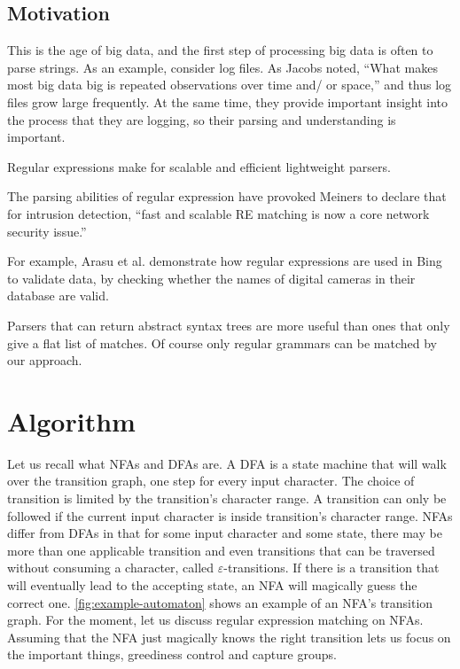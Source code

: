 \documentclass[english,twocolumn]{article}
\theoremstyle{definition}
\newcommand{\seclabel}[1]{\label{sec:#1}}
\begin{document}
\subsection{Motivation}

This is the age of big data, and the first step of processing big
data is often to parse strings. As an example, consider log files.
As Jacobs\cite{Jaco09a}
noted, ``What makes most big data big is repeated observations over
time and/ or space,'' and thus log files grow large frequently. At
the same time, they provide important insight into the process that
they are logging, so their parsing and understanding is important. 

Regular expressions make for scalable and efficient lightweight parsers.\cite{Kart96a} 

The parsing abilities of regular expression have provoked Meiners to declare
that for intrusion detection, ``fast and scalable RE matching is
now a core network security issue.'' \cite{Mein10a}

For example, Arasu et al. \cite{Aras12a} demonstrate how regular
expressions are used in Bing to validate data, by checking whether
the names of digital cameras in their database are valid.

Parsers that can return abstract syntax trees are more useful than
ones that only give a flat list of matches. Of course only regular
grammars can be matched by our approach.

\section{Algorithm}
\seclabel{algo}

Let us recall what NFAs and DFAs are. A DFA is a state machine that
will walk over the transition graph, one step for every input
character. The choice of transition is limited by the transition's
character range. A transition can only be followed if the current
input character is inside transition's character range. NFAs differ
from DFAs in that for some input character and some state, there
may be more than one applicable transition and even transitions that can
be traversed without consuming a character, called $\varepsilon$-transitions.
If there is a transition that will eventually lead to the accepting
state, an NFA will magically guess the correct one. \autoref{fig:example-automaton}
shows an example of an NFA's transition graph. For the moment, let
us discuss regular expression matching on NFAs. Assuming that the
NFA just magically knows the right transition lets us focus on the
important things, greediness control and capture groups.
\end{document}
